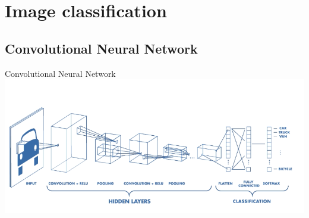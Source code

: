 \documentclass{beamer}
\begin{document}
\section{Image classification}

\subsection{Convolutional Neural Network}

\begin{frame}{Convolutional Neural Network}
\includegraphics[scale=0.45]{CNN}
\end{frame}
\end{document}
